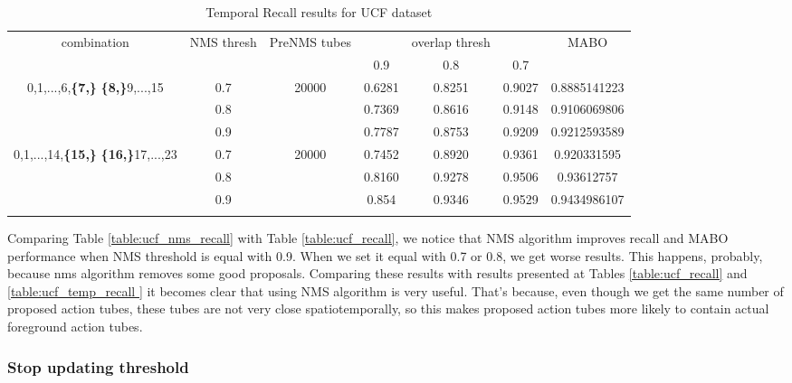 \begin{center}
  \setlength{\tabcolsep}{2.2pt}
\begin{longtable}{||c | c | c | c c c| c|}

  \hline
  \multirow{2}{*}{combination} & \multirow{2}{2.5em}{NMS thresh} & \multirow{2}{3.5em}{PreNMS tubes} &  {} &overlap thresh & {} & \multirow{2}{*}{MABO} \\
  {} & {} & {} &  0.9 &  0.8 & 0.7 & {}\\         
  \hline
  \multirow{3}{7em}{0,1,...,6,\textbf{\{7,\}}
  \textbf{\{8,\}}9,...,15 }  & 0.7 &\multirow{3}{*}{20000}  & 0.6281 & 0.8251 & 0.9027 & 0.8885141223  \\
  \cline{2-2} \cline{4-7} 
  {} &  0.8   & {}   & 0.7369 & 0.8616 & 0.9148 & 0.9106069806 \\
  \cline{2-2} \cline{4-7} 
  {} &  0.9   & {}   &  0.7787 & 0.8753 & 0.9209 & 0.9212593589 \\
  \hline                                    
  \multirow{3}{7em}{0,1,...,14,\textbf{\{15,\}}
  \textbf{\{16,\}}17,...,23 }  & 0.7 & \multirow{3}{*}{20000}   & 0.7452 & 0.8920 & 0.9361 & 0.920331595 \\
  \cline{2-2} \cline{4-7} 
  {} &  0.8   & {}   & 0.8160 & 0.9278 & 0.9506 & 0.93612757 \\
  \cline{2-2} \cline{4-7} 
  {} &  0.9   & {}   & 0.854 & 0.9346 & 0.9529 & 0.9434986107 \\
  \hline                                    

  \caption{Temporal Recall results for UCF dataset}
  \label{table:ucf_nms_temp_recall}
\end{longtable} 
\end{center}

Comparing Table \ref{table:ucf_nms_recall} with Table \ref{table:ucf_recall},  we notice that NMS algorithm improves recall and MABO
performance when NMS threshold is equal with 0.9. When we set it equal with 0.7 or 0.8, we get worse results. This happens, probably, because
nms algorithm removes some good proposals. Comparing these results with results presented at Tables \ref{table:ucf_recall} and \ref{table:ucf_temp_recall } it becomes clear that using NMS algorithm is very useful. That's because, even though we get the same number of proposed action tubes,
these tubes are not very close spatiotemporally, so this makes proposed action tubes more likely to contain actual foreground action tubes.

\subsubsection{Stop updating threshold}

